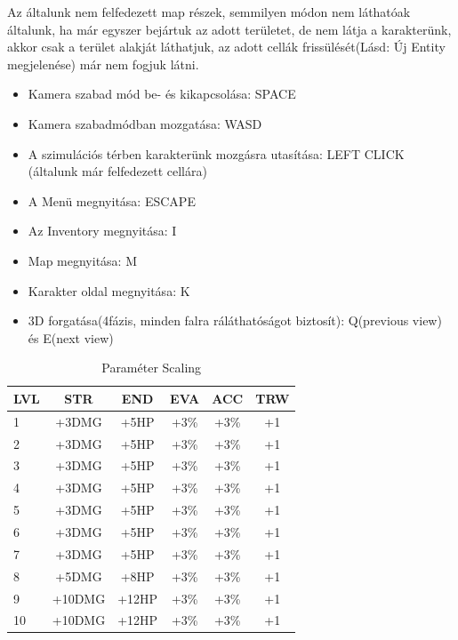 
Az általunk nem felfedezett map részek, semmilyen módon nem láthatóak általunk, ha már egyszer bejártuk az adott területet, 
de nem látja a karakterünk, akkor csak a terület alakját láthatjuk, az adott cellák frissülését(Lásd: Új Entity megjelenése) már nem fogjuk látni.


\begin{itemize}
    \item Kamera szabad mód be- és kikapcsolása: SPACE
    \item Kamera szabadmódban mozgatása: WASD
    \item A szimulációs térben karakterünk mozgásra utasítása: LEFT CLICK (általunk már felfedezett cellára)
    \item A Menü megnyitása: ESCAPE
    \item Az Inventory megnyitása: I
    \item Map megnyitása: M
    \item Karakter oldal megnyitása: K
    \item 3D forgatása(4fázis, minden falra ráláthatóságot biztosít): Q(previous view) és E(next view)
\end{itemize}


\begin{table}[!ht]
    \centering
    \caption{Paraméter Scaling}
    \label{table:scalingtable}
    \begin{tabular}{|l|c|c|c|c|c|}
    \hline
    LVL & STR  & END & EVA & ACC & TRW \\
    \hline
    1 & +3DMG & +5HP & +3\% & +3\% & +1 \\
    \hline
    2 & +3DMG & +5HP & +3\% & +3\% & +1 \\
    \hline
    3 & +3DMG & +5HP & +3\% & +3\% & +1 \\
    \hline
    4 & +3DMG & +5HP & +3\% & +3\% & +1 \\
    \hline
    5 & +3DMG & +5HP & +3\% & +3\% & +1 \\
    \hline
    6 & +3DMG & +5HP & +3\% & +3\% & +1 \\
    \hline
    7 & +3DMG & +5HP & +3\% & +3\% & +1 \\
    \hline
    8 & +5DMG & +8HP & +3\% & +3\% & +1 \\
    \hline
    9 & +10DMG & +12HP & +3\% & +3\% & +1 \\
    \hline
    10 & +10DMG & +12HP & +3\% & +3\% & +1 \\
    \hline
    \end{tabular}
\end{table}

